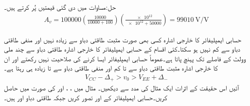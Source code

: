 حل:مساوات  میں دی گئی قیمتیں پُر کرتے ہیں۔
\begin{align*}
A_v=\num{100000} \left(\frac{\num{10000}}{\num{10000}+100}\right)\left(\frac{\num{e12}}{\num{e12}+\num{50000}}\right)=\SI{99010}{\volt\per\volt}
\end{align*}

حسابی ایمپلیفائر کا خارجی اشارہ  کسی بھی صورت مثبت طاقتی دباو  سے زیادہ نہیں اور منفی طاقتی دباو  سے کم نہیں ہو سکتا۔کئی اقسام کے حسابی ایمپلیفائر کا خارجی اشارہ طاقتی دباو سے چند ملی وولٹ کے فاصلے تک پہنچ پاتا ہے۔عموماً حسابی ایمپلیفائر ایسا کرنے کی صلاحیت نہیں رکھتے اور ان کا خارجی اشارہ مثبت طاقتی دباو سے  تا  کم اور منفی  طاقتی دباو سے  تا  زیادہ  ہی رہتا ہے۔
\begin{align}\label{مساوات_حسابی_خارجی_حدود}
V_{CC}-\Delta_+ > v_0 > V_{EE}+\Delta_-
\end{align}
آئیں اس حقیقت کے اثرات ایک مثال کی مدد سے دیکھیں۔
مثال  میں ، ،  اور  کی صورت میں  حاصل کریں۔حسابی ایمپلیفائر کے  اور  تصور کریں  جبکہ طاقتی دباو  اور  ہیں۔


